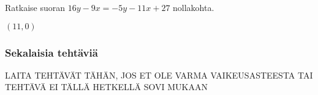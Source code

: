 \begin{tehtavasivu}
\begin{tehtava}
Ratkaise suoran $16y-9x=-5y-11x+27$ nollakohta.
\begin{vastaus}
$(11, 0)$
\end{vastaus}
\end{tehtava}

\subsubsection*{Sekalaisia tehtäviä}

LAITA TEHTÄVÄT TÄHÄN, JOS ET OLE VARMA VAIKEUSASTEESTA TAI TEHTÄVÄ
EI TÄLLÄ HETKELLÄ SOVI MUKAAN

\end{tehtavasivu}
